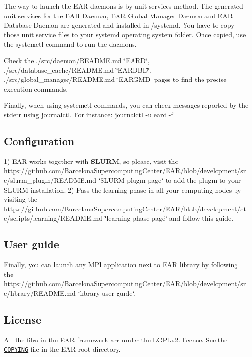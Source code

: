 The way to launch the E\+AR daemons is by unit services method. The generated unit services for the E\+AR Daemon, E\+AR Global Manager Daemon and E\+AR Database Daemon are generated and installed in {\ttfamily /systemd}. You have to copy those unit service files to your {\ttfamily systemd} operating system folder. Once copied, use the {\ttfamily systemctl} command to run the daemons.

Check the ./src/daemon/\+R\+E\+A\+D\+ME.md \char`\"{}\+E\+A\+R\+D\char`\"{}, ./src/database\+\_\+cache/\+R\+E\+A\+D\+ME.md \char`\"{}\+E\+A\+R\+D\+B\+D\char`\"{}, ./src/global\+\_\+manager/\+R\+E\+A\+D\+ME.md \char`\"{}\+E\+A\+R\+G\+M\+D\char`\"{} pages to find the precise execution commands.

Finally, when using {\ttfamily systemctl} commands, you can check messages reported by the stderr using journalctl. For instance\+: {\ttfamily journalctl -\/u eard -\/f}

\subsection*{Configuration }

1) E\+AR works together with {\bfseries S\+L\+U\+RM}, so please, visit the https\+://github.com/\+Barcelona\+Supercomputing\+Center/\+E\+A\+R/blob/development/src/slurm\+\_\+plugin/\+R\+E\+A\+D\+M\+E.\+md \char`\"{}\+S\+L\+U\+R\+M plugin page\char`\"{} to add the plugin to your S\+L\+U\+RM installation. 2) Pass the learning phase in all your computing nodes by visiting the https\+://github.com/\+Barcelona\+Supercomputing\+Center/\+E\+A\+R/blob/development/etc/scripts/learning/\+R\+E\+A\+D\+M\+E.\+md \char`\"{}learning phase page\char`\"{} and follow this guide.

\subsection*{User guide }

Finally, you can launch any M\+PI application next to E\+AR library by following the https\+://github.com/\+Barcelona\+Supercomputing\+Center/\+E\+A\+R/blob/development/src/library/\+R\+E\+A\+D\+M\+E.\+md \char`\"{}library user guide\char`\"{}.

\subsection*{License }

All the files in the E\+AR framework are under the L\+G\+P\+Lv2. license. See the \href{../../COPYING}{\tt C\+O\+P\+Y\+I\+NG} file in the E\+AR root directory. 
